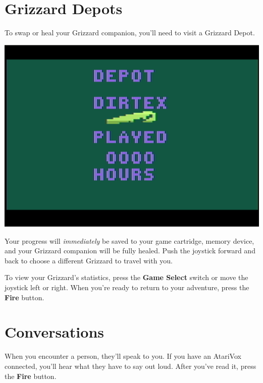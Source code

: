 \documentclass[10pt,twocolumn,openany,article]{memoir}
\begin{document}
\section{Grizzard Depots}\label{sec:GrizzardDepot}

To  \ifdefined\NOSAVE\else swap  or  \fi heal  your Grizzard  companion,
you'll need to visit a Grizzard Depot.

\begin{center}
  \includegraphics[width=\columnwidth]{../Manual/DepotScreenshotNTSC.png}
\end{center}

\ifdefined\NOSAVE\else Your progress will \emph{immediately} be saved to
your \ifdefined\ATARIAGESAVE  game cartridge,  \else memory  device, \fi
\fi   and    your   Grizzard    companion   will   be    fully   healed.
\ifdefined\NOSAVE\else  Push the  joystick  forward and  back to  choose
a different Grizzard to travel with you. \fi

To  view  your Grizzard's  statistics,  press  the \textbf{Game  Select}
switch or move  the joystick left or right. When  you're ready to return
to your adventure, press the \textbf{Fire} button.

\section{Conversations}

When  you encounter  a person,  they'll  speak to  you. If  you have  an
AtariVox  connected,  you'll  hear  what  they have  to  say  out  loud.
After you've read it, press the \textbf{Fire} button.
\end{document}
